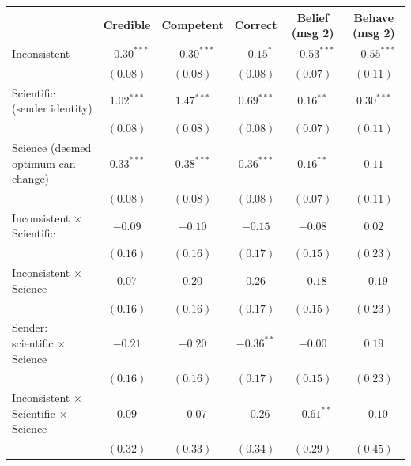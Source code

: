 
\begin{table}
\begin{center}
\begin{tabular}{l c c c c c}
\hline
 & Credible & Competent & Correct & Belief (msg 2) & Behave (msg 2) \\
\hline
Inconsistent                                      & $-0.30^{***}$ & $-0.30^{***}$ & $-0.15^{*}$  & $-0.53^{***}$ & $-0.55^{***}$ \\
                                                  & $(0.08)$      & $(0.08)$      & $(0.08)$     & $(0.07)$      & $(0.11)$      \\
Scientific (sender identity)                      & $1.02^{***}$  & $1.47^{***}$  & $0.69^{***}$ & $0.16^{**}$   & $0.30^{***}$  \\
                                                  & $(0.08)$      & $(0.08)$      & $(0.08)$     & $(0.07)$      & $(0.11)$      \\
Science (deemed optimum can change)               & $0.33^{***}$  & $0.38^{***}$  & $0.36^{***}$ & $0.16^{**}$   & $0.11$        \\
                                                  & $(0.08)$      & $(0.08)$      & $(0.08)$     & $(0.07)$      & $(0.11)$      \\
Inconsistent $\times$ Scientific                  & $-0.09$       & $-0.10$       & $-0.15$      & $-0.08$       & $0.02$        \\
                                                  & $(0.16)$      & $(0.16)$      & $(0.17)$     & $(0.15)$      & $(0.23)$      \\
Inconsistent $\times$ Science                     & $0.07$        & $0.20$        & $0.26$       & $-0.18$       & $-0.19$       \\
                                                  & $(0.16)$      & $(0.16)$      & $(0.17)$     & $(0.15)$      & $(0.23)$      \\
Sender: scientific $\times$ Science               & $-0.21$       & $-0.20$       & $-0.36^{**}$ & $-0.00$       & $0.19$        \\
                                                  & $(0.16)$      & $(0.16)$      & $(0.17)$     & $(0.15)$      & $(0.23)$      \\
Inconsistent $\times$ Scientific $\times$ Science & $0.09$        & $-0.07$       & $-0.26$      & $-0.61^{**}$  & $-0.10$       \\
                                                  & $(0.32)$      & $(0.33)$      & $(0.34)$     & $(0.29)$      & $(0.45)$      \\

\end{tabular}
\end{center}
\end{table}
